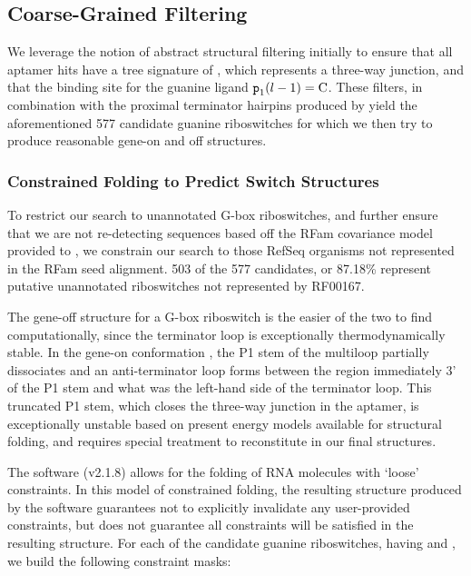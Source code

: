 \subsection{Coarse-Grained Filtering} \label{sub:coarse}

We leverage the notion of abstract structural filtering initially to ensure that all \infernal aptamer hits have a tree signature of \ms{[0, 1, 2, 2]}, which represents a three-way junction, and that the binding site for the guanine ligand ${\text{\mbox{\tt p}}}_{\text{1}}(l - 1) = \text{C}$. These filters, in combination with the proximal terminator hairpins produced by \tthp yield the aforementioned 577 candidate guanine riboswitches for which we then try to produce reasonable gene-on and off structures.

\subsubsection{Constrained Folding to Predict Switch Structures} \label{ssub:constfold}

To restrict our search to unannotated G-box riboswitches, and further ensure that we are not re-detecting sequences based off the RFam covariance model provided to \infernal, we constrain our search to those RefSeq organisms not represented in the RFam seed alignment. 503 of the 577 candidates, or 87.18\% represent putative unannotated riboswitches not represented by RF00167.

The gene-off structure \strOff for a G-box riboswitch is the easier of the two to find computationally, since the terminator loop is exceptionally thermodynamically stable. In the gene-on conformation \strOn, the P1 stem of the multiloop partially dissociates and an anti-terminator loop forms between the region immediately 3' of the P1 stem and what was the left-hand side of the terminator loop. This truncated P1 stem, which closes the three-way junction in the aptamer, is exceptionally unstable based on present energy models available for structural folding, and requires special treatment to reconstitute in our final structures.

The software \rfold (v2.1.8) allows for the folding of RNA molecules with `loose' constraints. In this model of constrained folding, the resulting structure produced by the software guarantees not to explicitly invalidate any user-provided constraints, but does not guarantee all constraints will be satisfied in the resulting structure. For each of the candidate guanine riboswitches, having \treeFor{\infernal} and \treeFor{\tthp}, we build the following constraint masks:

